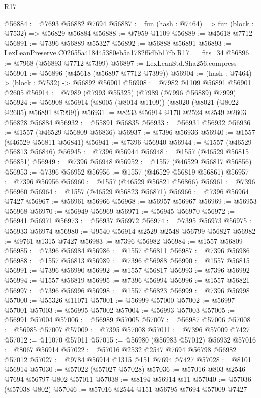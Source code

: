\begin{lexlean}{R17}
\begin{coremodule}
@56884 := @7693 @56882 @7694
@56887 := fun (hash : @7464) => fun (block : @7532) => @56829 @56884
@56888 := @7959 @1109
@56889 := @45618 @7712
@56891 := @7396 @56889 @55327
@56892 := @56888 @56891
@56893 := LexLeanPreserve.C02655a418445380eb5a1782f5dbb17fb.R17.__fits_34
@56896 := @7968 (@56893 @7712 @7399)
@56897 := LexLeanStd.Sha256.compress
@56901 := @56896 (@45618 (@56897 @7712 @7399))
@56904 := (hash : @7464) -> (block : @7532) -> @56892 @56901
@56908 := @7982 @1109 @56891 @56901 @2605
@56914 := @7989 (@7993 @55325) (@7989 (@7996 @56889) @7999)
@56924 := @56908 @56914 (@8005 (@8014 @1109)) (@8020 (@8021 (@8022 @2605) @56891 @7999))
@56931 := @8233 @56914 @170 @2524 @2549 @2603 @56828 @56884
@56932 := @55891 @56835
@56933 := @56931 @56932
@56936 := @1557 (@46529 @56809 @56836)
@56937 := @7396 @56936
@56940 := @1557 (@46529 @56811 @56841)
@56941 := @7396 @56940
@56944 := @1557 (@46529 @56813 @56846)
@56945 := @7396 @56944
@56948 := @1557 (@46529 @56815 @56851)
@56949 := @7396 @56948
@56952 := @1557 (@46529 @56817 @56856)
@56953 := @7396 @56952
@56956 := @1557 (@46529 @56819 @56861)
@56957 := @7396 @56956
@56960 := @1557 (@46529 @56821 @56866)
@56961 := @7396 @56960
@56964 := @1557 (@46529 @56823 @56871)
@56966 := @7396 @56964 @7427
@56967 := @56961 @56966
@56968 := @56957 @56967
@56969 := @56953 @56968
@56970 := @56949 @56969
@56971 := @56945 @56970
@56972 := @56941 @56971
@56973 := @56937 @56972
@56974 := @7395 @56973
@56975 := @56933 @56974
@56980 := @9540 @56914 @2529 @2548 @56799 @56827
@56982 := @9761 @1315 @7427
@56983 := @7396 @56982
@56984 := @1557 @56809
@56985 := @7396 @56984
@56986 := @1557 @56811
@56987 := @7396 @56986
@56988 := @1557 @56813
@56989 := @7396 @56988
@56990 := @1557 @56815
@56991 := @7396 @56990
@56992 := @1557 @56817
@56993 := @7396 @56992
@56994 := @1557 @56819
@56995 := @7396 @56994
@56996 := @1557 @56821
@56997 := @7396 @56996
@56998 := @1557 @56823
@56999 := @7396 @56998
@57000 := @55326 @11071
@57001 := @56999 @57000
@57002 := @56997 @57001
@57003 := @56995 @57002
@57004 := @56993 @57003
@57005 := @56991 @57004
@57006 := @56989 @57005
@57007 := @56987 @57006
@57008 := @56985 @57007
@57009 := @7395 @57008
@57011 := @7396 @57009 @7427
@57012 := @11070 @57011
@57015 := @56980 (@56983 @57012) @56932
@57016 := @8067 @56914
@57022 := @57016 @2532 @2547 @7694 @56798 @56982 @57012
@57027 := @9784 @56914 @1315 @151 @7694 @7427
@57028 := @8101 @56914
@57030 := @57022 (@57027 @57028)
@57036 := @57016 @803 @2546 @7694 @56797 @802 @57011
@57038 := @8194 @56914 @11
@57040 := @57036 (@57038 @802)
@57046 := @57016 @2544 @151 @56795 @7694 @57009 @7427

\end{coremodule}
\end{lexlean}
